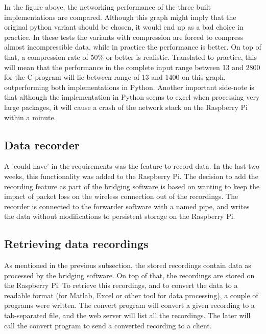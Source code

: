 In the figure above, the networking performance of the three built implementations are compared. Although this graph might imply that the original python variant should be chosen, it would end up as a bad choice in practice. In these tests the variants with compression are forced to compress almost incompressible data, while in practice the performance is better. On top of that, a compression rate of 50\% or better is realistic. Translated to practice, this will mean that the performance in the complete input range between 13 and 2800 for the C-program will lie between range of 13 and 1400 on this graph, outperforming both implementations in Python. Another important side-note is that although the implementation in Python seems to excel when processing very large packages, it will cause a crash of the network stack on the Raspberry Pi within a minute.

\subsection{Data recorder}

A 'could have' in the requirements was the feature to record data. In the last two weeks, this functionality was added to the Raspberry Pi. The decision to add the recording feature as part of the bridging software is based on wanting to keep the impact of packet loss on the wireless connection out of the recordings. The recorder is connected to the forwarder software with a named pipe, and writes the data without modifications to persistent storage on the Raspberry Pi.

\subsection{Retrieving data recordings}

As mentioned in the previous subsection, the stored recordings contain data as processed by the bridging software. On top of that, the recordings are stored on the Raspberry Pi. To retrieve this recordings, and to convert the data to a readable format (for Matlab, Excel or other tool for data processing), a couple of programs were written. The convert program will convert a given recording to a tab-separated file, and the web server will list all the recordings. The later will call the convert program to send a converted recording to a client.